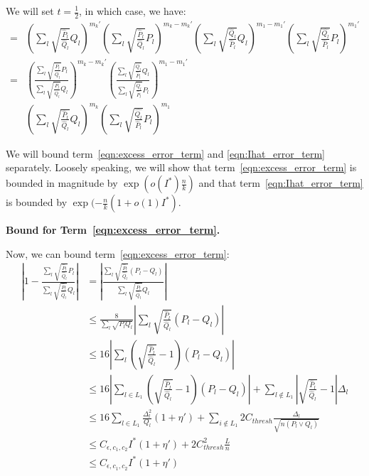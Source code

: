 \documentclass{article}
\begin{document}
We will set $t = \frac{1}{2}$, in which case, we have:
\begin{align}
=& \left( \sum_l \sqrt{\frac{\hat{P}_l}{\hat{Q}_l} } Q_l \right)^{m_k'}
 \left( \sum_l \sqrt{\frac{\hat{P}_l}{\hat{Q}_l} } P_l \right)^{m_k - m_k'}
 \left( \sum_l \sqrt{\frac{\hat{Q}_l}{\hat{P}_l} } Q_l \right)^{m_1 - m_1'}
       \left( \sum_l \sqrt{\frac{\hat{Q_l}}{\hat{P}_l} } P_l \right)^{m_1'} \nonumber \\
=&  \left( \frac{\sum_l \sqrt{\frac{\hat{P}_l}{\hat{Q}_l} } P_l}
                {\sum_l \sqrt{\frac{\hat{P}_l}{\hat{Q}_l} } Q_l}  \right)^{m_k - m_k'}
 \left( \frac{ \sum_l \sqrt{\frac{\hat{Q}_l}{\hat{P}_l} } Q_l}
             { \sum_l \sqrt{\frac{\hat{Q}_l}{\hat{P}_l} } P_l} \right)^{m_1 - m_1'}  
   \label{eqn:excess_error_term} \\
 & \left( \sum_l \sqrt{ \frac{\hat{P}_l}{\hat{Q}_l}} Q_l \right)^{m_k} 
    \left( \sum_l \sqrt{\frac{\hat{Q_l}}{\hat{P}_l} } P_l \right)^{m_1}
   \label{eqn:Ihat_error_term} 
\end{align} 

We will bound term~\ref{eqn:excess_error_term} and \ref{eqn:Ihat_error_term} separately. Loosely speaking, we will show that term~\ref{eqn:excess_error_term} is bounded in magnitude by $\exp( o(I^*) \frac{n}{k} )$ and that term~\ref{eqn:Ihat_error_term} is bounded by $\exp( - \frac{n}{k} (1 + o(1) I^*)$. 




\textbf{Bound for Term~\ref{eqn:excess_error_term}.} 

Now, we can bound term~\ref{eqn:excess_error_term}:
\begin{align*}
\left| 1 -  \frac{\sum_l \sqrt{\frac{\hat{P}_l}{\hat{Q}_l} } P_l}
                {\sum_l \sqrt{\frac{\hat{P}_l}{\hat{Q}_l} } Q_l}  \right|
 &= \left| \frac{ \sum_l \sqrt{ \frac{\hat{P}_l}{\hat{Q}_l}} (P_l - Q_l) }
     { \sum_l \sqrt{ \frac{\hat{P}_l}{\hat{Q}_l}} Q_l } \right| \\
&\leq \frac{8}{\sum_l \sqrt{P_l Q_l}} 
     \left| \sum_l \sqrt{ \frac{\hat{P}_l}{\hat{Q}_l} }(P_l - Q_l) \right| \\
&\leq 16 \left|  \sum_{l} \left( \sqrt{ \frac{\hat{P}_l}{\hat{Q}_l} } - 1 \right) (P_l - Q_l)  \right| \\
&\leq 16 \left| 
     \sum_{l \in L_1} \left( \sqrt{\frac{\hat{P}_l}{\hat{Q}_l}} - 1 \right)(P_l - Q_l) 
     \right| + \sum_{l \notin L_1} \left| \sqrt{ \frac{\hat{P}_l}{\hat{Q}_l}} - 1 \right| \Delta_l \\
&\leq 16 \sum_{l \in L_1} \frac{\Delta^2_l}{Q_l}(1+ \eta') + 
      \sum_{i \notin L_1} 2 C_{thresh} \frac{\Delta_l}{\sqrt{n (P_l \vee Q_l)}} \\
&\leq C_{\epsilon, c_1, c_2} I^* (1 + \eta') + 2 C_{thresh}^2 \frac{L}{n} \\
&\leq C_{\epsilon, c_1, c_2} I^* (1 + \eta')
\end{align*}
\end{document}
